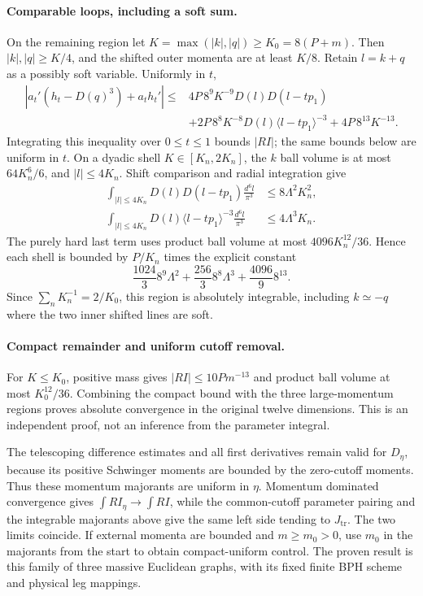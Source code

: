 \paragraph{Comparable loops, including a soft sum.}
On the remaining region let $K=\max(|k|,|q|)\ge K_0=8(P+m)$.
Then $|k|,|q|\ge K/4$, and the shifted outer momenta are at least
$K/8$. Retain $l=k+q$ as a possibly soft variable. Uniformly in $t$,
\begin{align*}
 |a_t'(h_t-D(q)^3)+a_t h_t'|
 \le{}&4P\,8^9K^{-9}D(l)D(l-tp_1)\\
          &+2P\,8^8K^{-8}D(l)\langle l-tp_1\rangle^{-3}
            +4P\,8^{13}K^{-13}.
\end{align*}
Integrating this inequality over $0\le t\le1$ bounds $|RI|$; the same
bounds below are uniform in $t$. On a dyadic shell $K\in[K_n,2K_n]$,
the $k$ ball volume is at most $64K_n^6/6$, and $|l|\le4K_n$.
Shift comparison and radial integration give
\begin{align*}
 \int_{|l|\le4K_n}D(l)D(l-tp_1)\frac{d^6l}{\pi^3}
        &\le8\Lambda^2K_n^2,\\
 \int_{|l|\le4K_n}D(l)\langle l-tp_1\rangle^{-3}
                                  \frac{d^6l}{\pi^3}
        &\le4\Lambda^3K_n.
\end{align*}
The purely hard last term uses product ball volume at most
$4096K_n^{12}/36$. Hence each shell is bounded by $P/K_n$ times the
explicit constant
\[
 \frac{1024}{3}8^9\Lambda^2
       +\frac{256}{3}8^8\Lambda^3+\frac{4096}{9}8^{13}.
\]
Since $\sum_nK_n^{-1}=2/K_0$, this region is absolutely integrable,
including $k\simeq-q$ where the two inner shifted lines are soft.

\paragraph{Compact remainder and uniform cutoff removal.}
For $K\le K_0$, positive mass gives $|RI|\le10Pm^{-13}$ and product
ball volume at most $K_0^{12}/36$. Combining the compact bound with the
three large-momentum regions proves absolute convergence in the original
twelve dimensions. This is an independent proof, not an inference from the
parameter integral.

The telescoping difference estimates and all first derivatives remain valid
for $D_\eta$, because its positive Schwinger moments are bounded by the
zero-cutoff moments. Thus these momentum majorants are uniform in $\eta$.
Momentum dominated convergence gives $\int RI_\eta\to\int RI$, while
the common-cutoff parameter pairing and the integrable majorants above give
the same left side tending to $J_{\mathrm{tr}}$. The two limits coincide.
If external momenta are bounded and $m\ge m_0>0$, use $m_0$ in the
majorants from the start to obtain compact-uniform control. The proven
result is this family of three massive Euclidean graphs, with its fixed
finite BPH scheme and physical leg mappings.
